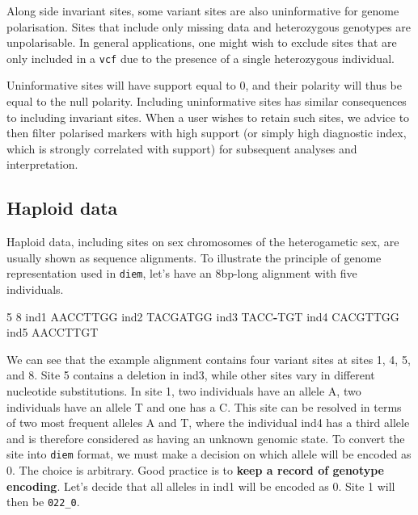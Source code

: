 \documentclass[
]{book}
\newenvironment{Shaded}{\begin{snugshade}}{\end{snugshade}}
\newcommand{\DecValTok}[1]{\textcolor[rgb]{0.00,0.00,0.81}{#1}}
\newcommand{\NormalTok}[1]{#1}
\newcommand{\SpecialCharTok}[1]{\textcolor[rgb]{0.81,0.36,0.00}{\textbf{#1}}}
\begin{document}
Along side invariant sites, some variant sites are also uninformative for genome polarisation. Sites that include only missing data and heterozygous genotypes are unpolarisable. In general applications, one might wish to exclude sites that are only included in a \texttt{vcf} due to the presence of a single heterozygous individual.

Uninformative sites will have support equal to 0, and their polarity will thus be equal to the null polarity. Including uninformative sites has similar consequences to including invariant sites. When a user wishes to retain such sites, we advice to then filter polarised markers with high support (or simply high diagnostic index, which is strongly correlated with support) for subsequent analyses and interpretation.

\subsection{Haploid data}\label{haploid-data}

Haploid data, including sites on sex chromosomes of the heterogametic sex, are usually shown as sequence alignments. To illustrate the principle of genome representation used in \texttt{diem}, let's have an 8bp-long alignment with five individuals.

\begin{Shaded}
\begin{Highlighting}[]
\DecValTok{5} \DecValTok{8}
\NormalTok{ind1   AACCTTGG}
\NormalTok{ind2   TACGATGG}
\NormalTok{ind3   TACC}\SpecialCharTok{{-}}\NormalTok{TGT}
\NormalTok{ind4   CACGTTGG}
\NormalTok{ind5   AACCTTGT}
\end{Highlighting}
\end{Shaded}

We can see that the example alignment contains four variant sites at sites 1, 4, 5, and 8. Site 5 contains a deletion in ind3, while other sites vary in different nucleotide substitutions. In site 1, two individuals have an allele A, two individuals have an allele T and one has a C. This site can be resolved in terms of two most frequent alleles A and T, where the individual ind4 has a third allele and is therefore considered as having an unknown genomic state. To convert the site into \texttt{diem} format, we must make a decision on which allele will be encoded as 0. The choice is arbitrary. Good practice is to \textbf{keep a record of genotype encoding}. Let's decide that all alleles in ind1 will be encoded as 0. Site 1 will then be \texttt{022\_0}.
\end{document}
